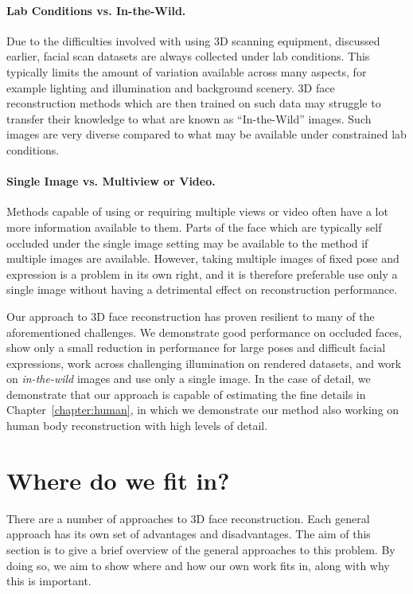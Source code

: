 \paragraph{Lab Conditions vs. In-the-Wild.} Due to the difficulties
involved with using 3D scanning equipment, discussed earlier, facial
scan datasets are always collected under lab conditions. This
typically limits the amount of variation available across many
aspects, for example lighting and illumination and background
scenery. 3D face reconstruction methods which are then trained on such
data may struggle to transfer their knowledge to what are known as
``In-the-Wild'' images. Such images are very diverse compared to what
may be available under constrained lab conditions.

\paragraph{Single Image vs. Multiview or Video.} Methods capable of
using or requiring multiple views or video often have a lot more
information available to them. Parts of the face which are typically
self occluded under the single image setting may be available to the
method if multiple images are available. However, taking multiple
images of fixed pose and expression is a problem in its own right, and
it is therefore preferable use only a single image without having a
detrimental effect on reconstruction performance.

Our approach to 3D face reconstruction has proven resilient to many of
the aforementioned challenges. We demonstrate good performance on
occluded faces, show only a small reduction in performance for large
poses and difficult facial expressions, work across challenging
illumination on rendered datasets, and work on \textit{in-the-wild}
images and use only a single image. In the case of detail, we
demonstrate that our approach is capable of estimating the fine
details in Chapter~\ref{chapter:human}, in which we demonstrate our
method also working on human body reconstruction with high levels of
detail.

\section{Where do we fit in?}

There are a number of approaches to 3D face reconstruction. Each
general approach has its own set of advantages and disadvantages. The
aim of this section is to give a brief overview of the general
approaches to this problem. By doing so, we aim to show where and how
our own work fits in, along with why this is important.

